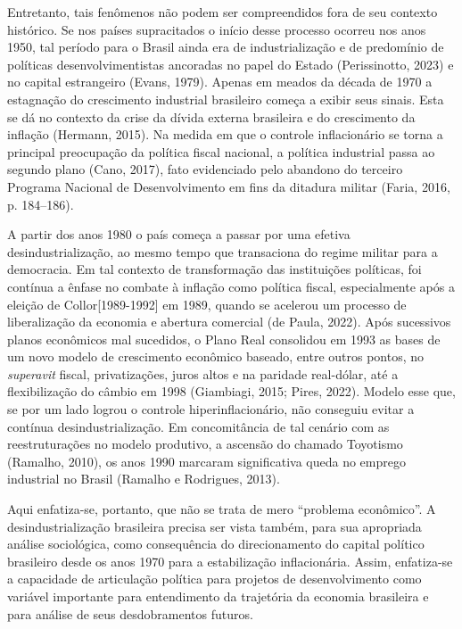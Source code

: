 Entretanto, tais fenômenos não podem ser compreendidos fora de seu
contexto histórico. Se nos países supracitados o início desse processo
ocorreu nos anos 1950, tal período para o Brasil ainda era de
industrialização e de predomínio de políticas desenvolvimentistas
ancoradas no papel do Estado (Perissinotto, 2023) e no capital
estrangeiro (Evans, 1979). Apenas em meados da década de 1970 a
estagnação do crescimento industrial brasileiro começa a exibir seus
sinais. Esta se dá no contexto da crise da dívida externa brasileira e
do crescimento da inflação (Hermann, 2015). Na medida em que o controle
inflacionário se torna a principal preocupação da política fiscal
nacional, a política industrial passa ao segundo plano (Cano, 2017),
fato evidenciado pelo abandono do terceiro Programa Nacional de
Desenvolvimento em fins da ditadura militar (Faria, 2016, p. 184--186).

A partir dos anos 1980 o país começa a passar por uma efetiva
desindustrialização, ao mesmo tempo que transaciona do regime militar
para a democracia. Em tal contexto de transformação das instituições
políticas, foi contínua a ênfase no combate à inflação como política
fiscal, especialmente após a eleição de Collor{[}1989-1992{]} em 1989,
quando se acelerou um processo de liberalização da economia e abertura
comercial (de Paula, 2022). Após sucessivos planos econômicos mal
sucedidos, o Plano Real consolidou em 1993 as bases de um novo modelo de
crescimento econômico baseado, entre outros pontos, no \emph{superavit}
fiscal, privatizações, juros altos e na paridade real-dólar, até a
flexibilização do câmbio em 1998 (Giambiagi, 2015; Pires, 2022). Modelo
esse que, se por um lado logrou o controle hiperinflacionário, não
conseguiu evitar a contínua desindustrialização. Em concomitância de tal
cenário com as reestruturações no modelo produtivo, a ascensão do
chamado Toyotismo (Ramalho, 2010), os anos 1990 marcaram significativa
queda no emprego industrial no Brasil (Ramalho e Rodrigues, 2013).

Aqui enfatiza-se, portanto, que não se trata de mero ``problema
econômico''. A desindustrialização brasileira precisa ser vista também,
para sua apropriada análise sociológica, como consequência do
direcionamento do capital político brasileiro desde os anos 1970 para a
estabilização inflacionária. Assim, enfatiza-se a capacidade de
articulação política para projetos de desenvolvimento como variável
importante para entendimento da trajetória da economia brasileira e para
análise de seus desdobramentos futuros.

